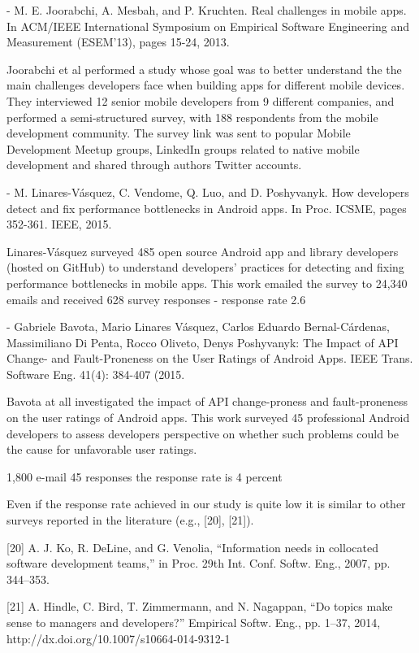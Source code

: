 - M. E. Joorabchi, A. Mesbah, and P. Kruchten. Real challenges in mobile apps. In
ACM/IEEE International Symposium on Empirical Software Engineering and Measurement (ESEM'13), pages 15-24, 2013.

  Joorabchi et al performed a study whose goal was to better understand the the main challenges developers face when building apps for different mobile devices. They interviewed 12 senior mobile developers from 9 different companies, and performed a semi-structured survey, with 188 respondents from the mobile development community. The survey link was sent to popular Mobile Development Meetup groups, LinkedIn groups related to native mobile development and shared through authors Twitter accounts.


- M. Linares-Vásquez, C. Vendome, Q. Luo, and D. Poshyvanyk. How developers detect and fix performance bottlenecks in Android apps. In Proc. ICSME, pages 352-361. IEEE, 2015.


 Linares-Vásquez surveyed 485 open source Android app and library developers (hosted on GitHub) to understand developers’ practices for detecting and fixing performance bottlenecks in mobile apps.  This work emailed the survey to 24,340 emails and received 628 survey responses - response rate 2.6%




- Gabriele Bavota, Mario Linares Vásquez, Carlos Eduardo Bernal-Cárdenas, Massimiliano Di Penta, Rocco Oliveto, Denys Poshyvanyk: The Impact of API Change- and Fault-Proneness on the User Ratings of Android Apps. IEEE Trans. Software Eng. 41(4): 384-407 (2015.

 Bavota at all investigated the impact of API change-proness and fault-proneness on the user ratings of Android apps. This work surveyed 45 professional Android developers to assess developers perspective on whether such problems could be the cause for unfavorable user ratings. 

1,800 e-mail
45 responses
the response rate is 4 percent


Even if the response rate achieved in our study is quite low it is similar to other surveys reported in the literature (e.g., [20], [21]).

[20] A. J. Ko, R. DeLine, and G. Venolia, “Information needs in collocated
software development teams,” in Proc. 29th Int. Conf. Softw.
Eng., 2007, pp. 344–353.

[21] A. Hindle, C. Bird, T. Zimmermann, and N. Nagappan, “Do topics
make sense to managers and developers?” Empirical Softw. Eng.,
pp. 1–37, 2014, http://dx.doi.org/10.1007/s10664-014-9312-1




